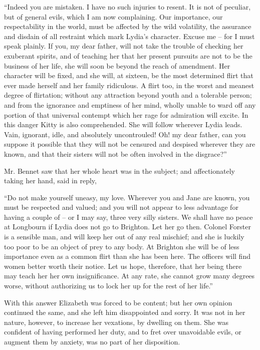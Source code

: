 “Indeed you are mistaken. I have no such injuries
to resent. It is not of peculiar, but of general evils,
which I am now complaining. Our importance, our
respectability in the world, must be affected by the wild
volatility, the assurance and disdain of all restraint which
mark Lydia’s character. Excuse me -- for I must speak
plainly. If you, my dear father, will not take the trouble
of checking her exuberant spirits, and of teaching her that
her present pursuits are not to be the business of her life,
she will soon be beyond the reach of amendment. Her
character will be fixed, and she will, at sixteen, be the most
determined flirt that ever made herself and her family
ridiculous. A flirt too, in the worst and meanest degree
of flirtation; without any attraction beyond youth and
a tolerable person; and from the ignorance and emptiness
of her mind, wholly unable to ward off any portion of
that universal contempt which her rage for admiration
will excite. In this danger Kitty is also comprehended.
She will follow wherever Lydia leads. Vain, ignorant,
idle, and absolutely uncontrouled! Oh! my dear father,
can you suppose it possible that they will not be censured
and despised wherever they are known, and that their
sisters will not be often involved in the disgrace?”

Mr. Bennet saw that her whole heart was in the subject;
and affectionately taking her hand, said in reply,

“Do not make yourself uneasy, my love. Wherever
you and Jane are known, you must be respected and
valued; and you will not appear to less advantage for
having a couple of -- or I may say, three very silly sisters.
We shall have no peace at Longbourn if Lydia does not
go to Brighton. Let her go then. Colonel Forster is
a sensible man, and will keep her out of any real mischief;
and she is luckily too poor to be an object of prey to
any body. At Brighton she will be of less importance even
as a common flirt than she has been here. The officers
will find women better worth their notice. Let us hope,
therefore, that her being there may teach her her own
insignificance. At any rate, she cannot grow many degrees
worse, without authorizing us to lock her up for the rest
of her life.”

With this answer Elizabeth was forced to be content;
but her own opinion continued the same, and she left
him disappointed and sorry. It was not in her nature,
however, to increase her vexations, by dwelling on them.
She was confident of having performed her duty, and to
fret over unavoidable evils, or augment them by anxiety,
was no part of her disposition.

